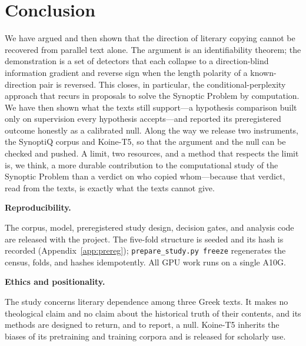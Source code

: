 \documentclass[11pt,letterpaper]{article}
\begin{document}
\section{Conclusion}
\label{sec:conclusion}

We have argued and then shown that the direction of literary copying cannot be recovered from parallel text alone. The argument is an identifiability theorem; the demonstration is a set of detectors that each collapse to a direction-blind information gradient and reverse sign when the length polarity of a known-direction pair is reversed. This closes, in particular, the conditional-perplexity approach that recurs in proposals to solve the Synoptic Problem by computation. We have then shown what the texts still support---a hypothesis comparison built only on supervision every hypothesis accepts---and reported its preregistered outcome honestly as a calibrated null. Along the way we release two instruments, the SynoptiQ corpus and Koine-T5, so that the argument and the null can be checked and pushed. A limit, two resources, and a method that respects the limit is, we think, a more durable contribution to the computational study of the Synoptic Problem than a verdict on who copied whom---because that verdict, read from the texts, is exactly what the texts cannot give.

\vspace{0.5em}
{\headfont\bfseries\color{marine}\small Reproducibility.}\par
\small The corpus, model, preregistered study design, decision gates, and analysis code are released with the project. The five-fold structure is seeded and its hash is recorded (Appendix~\ref{app:prereg}); \texttt{prepare\_study.py freeze} regenerates the census, folds, and hashes idempotently. All GPU work runs on a single A10G.

\par\vspace{4pt}
{\headfont\bfseries\color{marine}\small Ethics and positionality.}\par
\small The study concerns literary dependence among three Greek texts. It makes no theological claim and no claim about the historical truth of their contents, and its methods are designed to return, and to report, a null. Koine-T5 inherits the biases of its pretraining and training corpora and is released for scholarly use.
\end{document}
